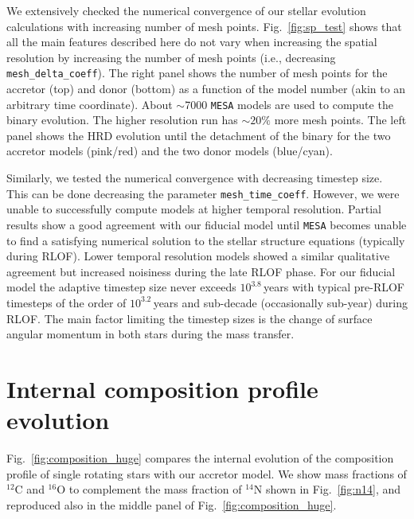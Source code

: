 \documentclass[twocolumn,twocolappendix,trackchanges]{aastex63}
\DeclareRobustCommand{\Figref}[1]{Fig.~\ref{#1}}
\begin{document}
We extensively checked the numerical convergence of our stellar
evolution calculations with increasing number of mesh
points. \Figref{fig:sp_test} shows that all the main features described
here do not vary when increasing the spatial resolution by increasing
the number of mesh points (i.e.,
decreasing \texttt{mesh\_delta\_coeff}). The right panel shows the
number of mesh points for the accretor (top) and donor (bottom) as a
function of the model number (akin to an arbitrary time
coordinate). About $\sim$7000 \texttt{MESA} models are used to compute
the binary evolution. The higher resolution run has $\sim 20\%$ more
mesh points. The left panel shows the HRD evolution until the
detachment of the binary for the two accretor models (pink/red) and
the two donor models (blue/cyan).

Similarly, we tested the numerical convergence with decreasing
timestep size. This can be done decreasing the parameter
\texttt{mesh\_time\_coeff}. However, we were unable to successfully
compute models at higher temporal resolution. Partial results show a
good agreement with our fiducial model until \texttt{MESA} becomes
unable to find a satisfying numerical solution to the stellar
structure equations (typically
during RLOF). Lower temporal resolution models showed a similar
qualitative agreement but increased noisiness during the late RLOF
phase. For our fiducial model the adaptive timestep size never exceeds
$10^{3.8}$\,years with typical pre-RLOF timesteps of the order of $10^{3.2}$\,years
and sub-decade (occasionally sub-year) during RLOF. The main factor limiting the timestep
sizes is the change of surface angular momentum in both stars during
the mass transfer.


\section{Internal composition profile evolution}
\label{sec:X_fig}


\Figref{fig:composition_huge} compares the internal evolution of the composition
profile of single rotating stars with our accretor model.
We show mass fractions of $^{12}\mathrm{C}$  and $^{16}\mathrm{O}$ to complement the
mass fraction of $^{14}\mathrm{N}$ shown in \Figref{fig:n14}, and
reproduced also in the middle panel of \Figref{fig:composition_huge}.
\end{document}
